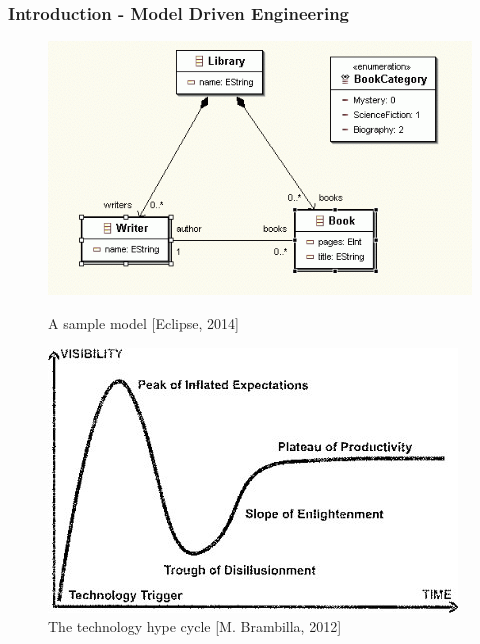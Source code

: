 \begin{frame}
\frametitle{Introduction - Model Driven Engineering}

	\begin{figure}
		\begin{minipage}[b]{0.38\textwidth}
			\includegraphics[width=0.9\linewidth]{figures/sample_model.png}
		\caption{A sample model [Eclipse, 2014]}
		\label{uml_sample}
		\end{minipage}
	\begin{minipage}[b]{0.4\textwidth}
		\includegraphics[width=0.9\linewidth]{figures/mde_pos.jpg}
	\caption{The technology hype cycle [M. Brambilla, 2012]}
	\label{mde_pos}
	\end{minipage}
	\begin{minipage}{0.1\textwidth}
	\vspace{10mm}
	\end{minipage}
	\end{figure}
\end{frame}



